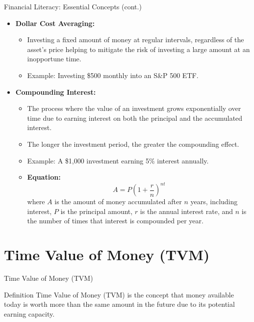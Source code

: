\documentclass{beamer}
\begin{document}
\begin{frame}{Financial Literacy: Essential Concepts (cont.)}
    \begin{itemize}
        \item \textbf{Dollar Cost Averaging:}
        \begin{itemize}
            \item Investing a fixed amount of money at regular intervals, regardless of the asset's price helping to mitigate the risk of investing a large amount at an inopportune time.
            \item Example: Investing \$500 monthly into an S&P 500 ETF.
        \end{itemize}
        \item \textbf{Compounding Interest:}
        \begin{itemize}
            \item The process where the value of an investment grows exponentially over time due to earning interest on both the principal and the accumulated interest.
            \item The longer the investment period, the greater the compounding effect.
            \item Example: A \$1,000 investment earning 5\% interest annually.
            \item \textbf{Equation:}
            \begin{equation*}
                A = P \left(1 + \frac{r}{n}\right)^{nt}
            \end{equation*}
            where \( A \) is the amount of money accumulated after \( n \) years, including interest, \( P \) is the principal amount, \( r \) is the annual interest rate, and \( n \) is the number of times that interest is compounded per year.
        \end{itemize}
    \end{itemize}
\end{frame}

\section{Time Value of Money (TVM)}
\begin{frame}{Time Value of Money (TVM)}
    \begin{block}{Definition}
        Time Value of Money (TVM) is the concept that money available today is worth more than the same amount in the future due to its potential earning capacity.
    \end{block}
\end{frame}
\end{document}
